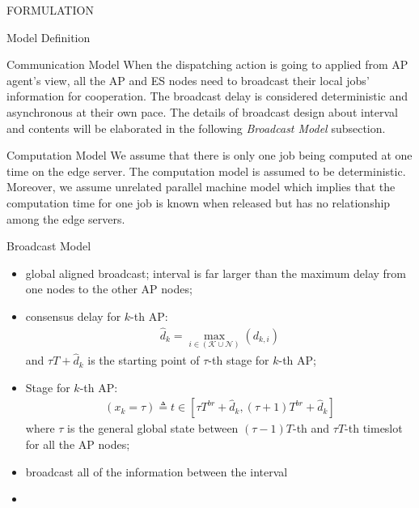 \documentclass[10pt, conference, letterpaper]{IEEEtran}
\begin{document}
\begin{section}{FORMULATION}
\begin{subsection}{Model Definition}
\begin{subsubsection}{Communication Model}
                When the dispatching action is going to applied from AP agent's view, all the AP and ES nodes need to broadcast their local jobs' information for cooperation. The broadcast delay is considered deterministic and asynchronous at their own pace.
                The details of broadcast design about interval and contents will be elaborated in the following \textit{Broadcast Model} subsection.
            \end{subsubsection}

            \begin{subsubsection}{Computation Model}
                We assume that there is only one job being computed at one time on the edge server. The computation model is assumed to be deterministic.
                Moreover, we assume unrelated parallel machine model which implies that the computation time for one job is known when released but has no relationship among the edge servers.
            \end{subsubsection}

            \begin{subsubsection}{Broadcast Model}

                \begin{itemize}
                    \item global aligned broadcast; interval is far larger than the maximum delay from one nodes to the other AP nodes;
                    \item consensus delay for $k$-th AP:
                        \begin{align}
                            \hat{d}_k = \max_{i\in(\mathcal{K}\cup\mathcal{N})}(d_{k,i})
                        \end{align}
                        and $\tau T + \hat{d}_k$ is the starting point of $\tau$-th stage for $k$-th AP;
                    \item Stage for $k$-th AP:
                        \begin{align}
                            (x_k={\tau})\triangleq t \in [\tau T^{br}+\hat{d}_k, (\tau+1) T^{br}+\hat{d}_k]
                        \end{align}
                        where $\tau$ is the general global state between $(\tau-1) T$-th and $\tau T$-th timeslot for all the AP nodes;
                    \item broadcast all of the information between the interval
                    \item 
                \end{itemize}


\end{subsubsection}
\end{subsection}
\end{section}
\end{document}
